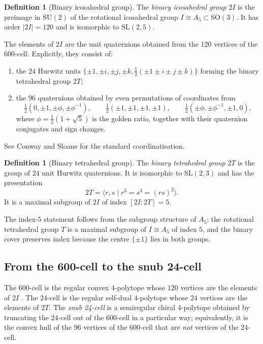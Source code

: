 \documentclass[10pt,reqno]{amsart}
\theoremstyle{plain}
\theoremstyle{definition}
\newtheorem{definition}[theorem]{Definition}
\begin{document}
\begin{definition}[Binary icosahedral group]
The \emph{binary icosahedral group} $2I$ is the preimage in $\mathrm{SU}(2)$ of the rotational icosahedral group $I \cong A_5 \subset \mathrm{SO}(3)$. It has order $|2I| = 120$ and is isomorphic to $\mathrm{SL}(2,5)$.
\end{definition}

The elements of $2I$ are the unit quaternions obtained from the $120$ vertices of the 600-cell. Explicitly, they consist of:
\begin{enumerate}
\item[(i)] the $24$ Hurwitz units $\{ \pm1, \pm i, \pm j, \pm k, \frac12(\pm1\pm i\pm j\pm k) \}$ forming the binary tetrahedral group $2T$;
\item the $96$ quaternions obtained by even permutations of coordinates from
\begin{equation}\label{eq:golden}
\tfrac12(0, \pm1, \pm\phi, \pm\phi^{-1}),\qquad
\tfrac12(\pm1, \pm1, \pm1, \pm1),\qquad
\tfrac12(\pm\phi, \pm\phi^{-1}, \pm1, 0),
\end{equation}
where $\phi = \frac12(1+\sqrt5)$ is the golden ratio, together with their quaternion conjugates and sign changes.
\end{enumerate}
See Conway and Sloane \cite[Ch.~8]{CS1999} for the standard coordinatisation.

\begin{definition}[Binary tetrahedral group]
The \emph{binary tetrahedral group} $2T$ is the group of $24$ unit Hurwitz quaternions. It is isomorphic to $\mathrm{SL}(2,3)$ and has the presentation
\begin{equation}
2T = \langle r, s \mid r^3 = s^3 = (rs)^2 \rangle.
\end{equation}
It is a maximal subgroup of $2I$ of index $[2I : 2T] = 5$.
\end{definition}

The index-$5$ statement follows from the subgroup structure of $A_5$: the rotational tetrahedral group $T$ is a maximal subgroup of $I \cong A_5$ of index $5$, and the binary cover preserves index because the centre $\{\pm1\}$ lies in both groups.

\subsection{From the 600-cell to the snub 24-cell}

The 600-cell is the regular convex 4-polytope whose $120$ vertices are the elements of $2I$ \cite{Coxeter1946,CS1999}. The 24-cell is the regular self-dual 4-polytope whose $24$ vertices are the elements of $2T$. The \emph{snub 24-cell} is a semiregular chiral 4-polytope obtained by truncating the 24-cell out of the 600-cell in a particular way; equivalently, it is the convex hull of the $96$ vertices of the 600-cell that are \emph{not} vertices of the 24-cell.
\end{document}
